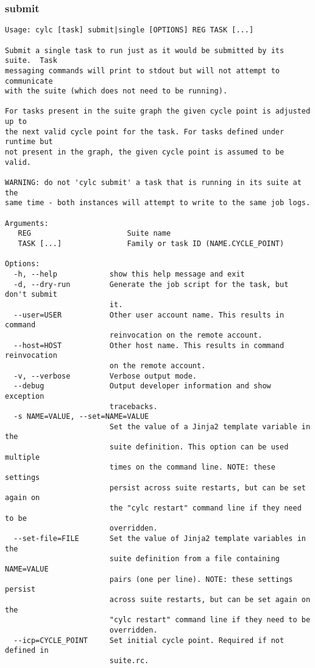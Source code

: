 \subsubsection{submit}
\label{submit}
\begin{lstlisting}
Usage: cylc [task] submit|single [OPTIONS] REG TASK [...] 

Submit a single task to run just as it would be submitted by its suite.  Task
messaging commands will print to stdout but will not attempt to communicate
with the suite (which does not need to be running).

For tasks present in the suite graph the given cycle point is adjusted up to
the next valid cycle point for the task. For tasks defined under runtime but
not present in the graph, the given cycle point is assumed to be valid.

WARNING: do not 'cylc submit' a task that is running in its suite at the
same time - both instances will attempt to write to the same job logs.

Arguments:
   REG                      Suite name
   TASK [...]               Family or task ID (NAME.CYCLE_POINT)

Options:
  -h, --help            show this help message and exit
  -d, --dry-run         Generate the job script for the task, but don't submit
                        it.
  --user=USER           Other user account name. This results in command
                        reinvocation on the remote account.
  --host=HOST           Other host name. This results in command reinvocation
                        on the remote account.
  -v, --verbose         Verbose output mode.
  --debug               Output developer information and show exception
                        tracebacks.
  -s NAME=VALUE, --set=NAME=VALUE
                        Set the value of a Jinja2 template variable in the
                        suite definition. This option can be used multiple
                        times on the command line. NOTE: these settings
                        persist across suite restarts, but can be set again on
                        the "cylc restart" command line if they need to be
                        overridden.
  --set-file=FILE       Set the value of Jinja2 template variables in the
                        suite definition from a file containing NAME=VALUE
                        pairs (one per line). NOTE: these settings persist
                        across suite restarts, but can be set again on the
                        "cylc restart" command line if they need to be
                        overridden.
  --icp=CYCLE_POINT     Set initial cycle point. Required if not defined in
                        suite.rc.
\end{lstlisting}

